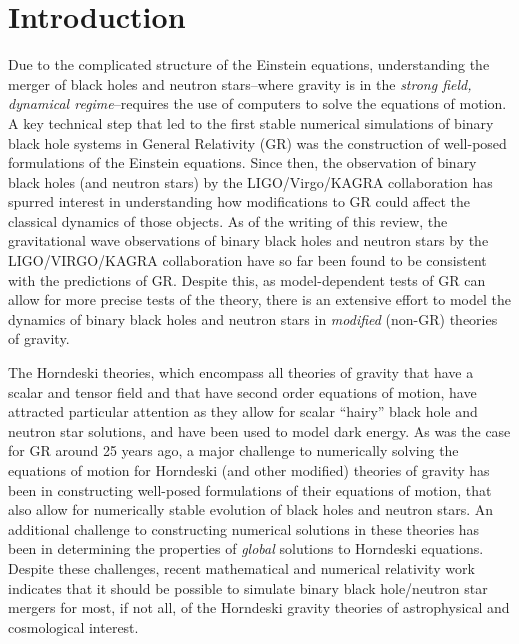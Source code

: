 \documentclass{ws-ijmpd}
\begin{document}
\section{Introduction	
   \label{sec:introduction}
}
Due to the complicated structure of the Einstein equations,
understanding the merger of black holes and neutron stars--where 
gravity is in the
\emph{strong field, dynamical regime}--requires the use of
computers to solve the equations of motion\cite{alcubierre2008introduction,
baumgarte2010numerical}. 
A key technical step that led to the first stable numerical
simulations of binary black hole systems in General Relativity (GR)
was the construction of well-posed formulations of the  Einstein 
equations\cite{Pretorius:2005gq,
Campanelli:2005dd,Baker:2005vv,Pretorius:2007nq}.
Since then, the observation of binary black holes (and neutron stars)
by the LIGO/Virgo/KAGRA
collaboration\cite{LIGOScientific:2016aoc,
LIGOScientific:2016sjg,LIGOScientific:2017vwq} 
has spurred interest in understanding how modifications to GR
could affect the classical dynamics of those objects\cite{Yunes:2013dva,
Berti:2015itd,Foucart:2022iwu}. 
As of the writing of this review,
the gravitational wave observations of binary black holes and neutron
stars by the LIGO/VIRGO/KAGRA collaboration have so far
been found to be consistent with the predictions of 
GR\cite{Yunes:2013dva,LIGOScientific:2016lio,LIGOScientific:2019fpa,
LIGOScientific:2020tif,Krishnendu:2021fga}.
Despite this,  
as model-dependent tests of GR can allow for more precise tests of the theory,
there is an extensive effort to model the dynamics of binary black holes
and neutron stars in \emph{modified} (non-GR) 
theories of gravity\cite{Berti:2015itd,Foucart:2022iwu}.

The Horndeski theories\cite{horndeski_paper,Deffayet:2009wt,Deffayet:2011gz},
which encompass all theories of gravity
that have a scalar and tensor field and that have second 
order equations of motion, have attracted particular attention
as they allow for scalar ``hairy'' black hole and neutron
star solutions\cite{Damour:1993hw,Kanti:1995vq,Sotiriou:2013qea},
and have been used to model dark energy\cite{Copeland:2006wr}.
As was the case for GR around 25 years ago, 
a major challenge to numerically solving the equations
of motion for Horndeski (and other modified) theories 
of gravity has been in constructing 
well-posed formulations of their equations of motion, that also
allow for numerically stable evolution of black holes 
and neutron stars\cite{Cayuso:2017iqc,
Allwright:2018rut,Bernard:2019fjb,Kovacs:2019jqj,
Witek:2020uzz,Kovacs:2020pns,Kovacs:2020ywu}.
An additional challenge to constructing numerical solutions
in these theories has been in determining the properties of 
\emph{global} solutions to Horndeski equations.
Despite these challenges, recent mathematical and numerical
relativity work indicates that it should be 
possible to simulate binary black hole/neutron star 
mergers for most, if not all, of the Horndeski gravity theories of
astrophysical and cosmological interest.
\end{document}
